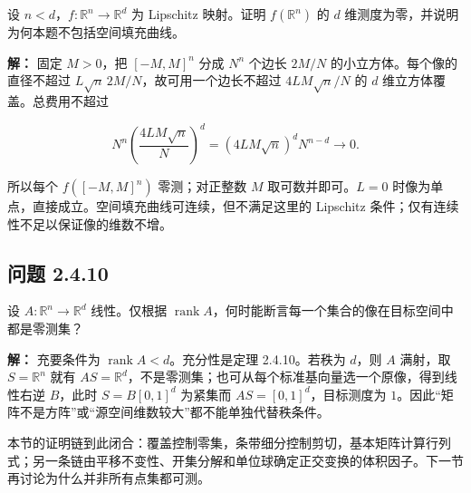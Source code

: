 \documentclass[11pt,a4paper]{article}
\begin{document}
设 \(n<d\)，\(f:\mathbb R^n\to\mathbb R^d\) 为 Lipschitz 映射。证明
\(f(\mathbb R^n)\) 的 \(d\)
维测度为零，并说明为何本题不包括空间填充曲线。

\textbf{解：} 固定 \(M>0\)，把 \([-M,M]^n\) 分成 \(N^n\) 个边长 \(2M/N\)
的小立方体。每个像的直径不超过 \(L\sqrt n\,2M/N\)，故可用一个边长不超过
\(4LM\sqrt n/N\) 的 \(d\) 维立方体覆盖。总费用不超过

\begin{equation*}
N^n\left(\frac{4LM\sqrt n}{N}\right)^d
=(4LM\sqrt n)^dN^{n-d}\longrightarrow0.
\end{equation*}

所以每个 \(f([-M,M]^n)\) 零测；对正整数 \(M\) 取可数并即可。\(L=0\)
时像为单点，直接成立。空间填充曲线可连续，但不满足这里的 Lipschitz
条件；仅有连续性不足以保证像的维数不增。

\subsection{问题 2.4.10}\label{ux95eeux9898-2.4.10}

设 \(A:\mathbb R^n\to\mathbb R^d\) 线性。仅根据
\(\operatorname{rank}A\)，何时能断言每一个集合的像在目标空间中都是零测集？

\textbf{解：} 充要条件为 \(\operatorname{rank}A<d\)。充分性是定理
2.4.10。若秩为 \(d\)，则 \(A\) 满射，取 \(S=\mathbb R^n\) 就有
\(AS=\mathbb R^d\)，不是零测集；也可从每个标准基向量选一个原像，得到线性右逆
\(B\)，此时 \(S=B[0,1]^d\) 为紧集而 \(AS=[0,1]^d\)，目标测度为
\(1\)。因此``矩阵不是方阵''或``源空间维数较大''都不能单独代替秩条件。

本节的证明链到此闭合：覆盖控制零集，条带细分控制剪切，基本矩阵计算行列式；另一条链由平移不变性、开集分解和单位球确定正交变换的体积因子。下一节再讨论为什么并非所有点集都可测。
\end{document}
